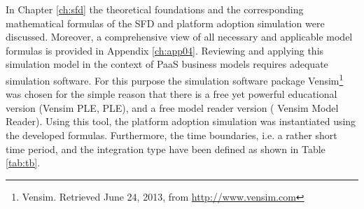 In Chapter \ref{ch:sfd} the theoretical foundations and the corresponding mathematical formulas of the \ac{SFD} and platform adoption simulation were discussed. Moreover, a comprehensive view of all necessary and applicable model formulas is provided in Appendix \ref{ch:app04}. Reviewing and applying this simulation model in the context of \ac{PaaS} business models requires adequate simulation software. For this purpose the simulation software package Vensim\footnote{Vensim. Retrieved June 24, 2013, from \url{http://www.vensim.com}} was chosen for the simple reason that there is a free yet powerful educational version (Vensim \acs{PLE}, \acl{PLE}), and a free model reader version ( Vensim Model Reader). Using this tool, the platform adoption simulation was instantiated using the developed formulas. Furthermore, the time boundaries, i.e. a rather short time period, and the integration type have been defined as shown in Table \ref{tab:tb}.

